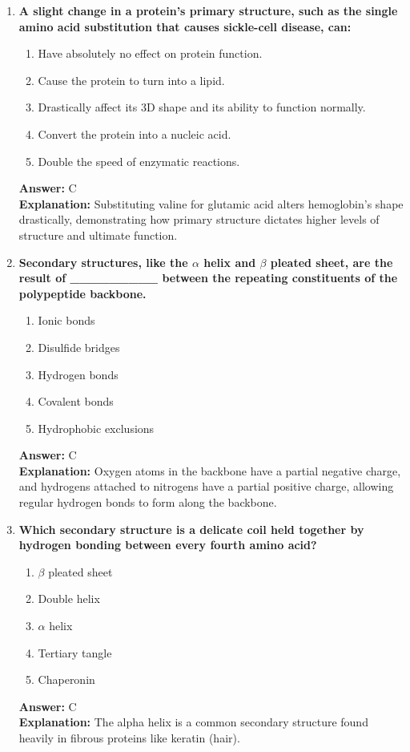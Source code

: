 \documentclass[11pt, a4paper]{article}
\begin{document}
\begin{enumerate}
\item \textbf{A slight change in a protein's primary structure, such as the single amino acid substitution that causes sickle-cell disease, can:}
\begin{enumerate}[label=\Alph*.]
    \item Have absolutely no effect on protein function.
    \item Cause the protein to turn into a lipid.
    \item Drastically affect its 3D shape and its ability to function normally.
    \item Convert the protein into a nucleic acid.
    \item Double the speed of enzymatic reactions.
\end{enumerate}
\textbf{Answer:} C \\
\textbf{Explanation:} Substituting valine for glutamic acid alters hemoglobin's shape drastically, demonstrating how primary structure dictates higher levels of structure and ultimate function.

\item \textbf{Secondary structures, like the $\alpha$ helix and $\beta$ pleated sheet, are the result of \_\_\_\_\_\_\_\_\_ between the repeating constituents of the polypeptide backbone.}
\begin{enumerate}[label=\Alph*.]
    \item Ionic bonds
    \item Disulfide bridges
    \item Hydrogen bonds
    \item Covalent bonds
    \item Hydrophobic exclusions
\end{enumerate}
\textbf{Answer:} C \\
\textbf{Explanation:} Oxygen atoms in the backbone have a partial negative charge, and hydrogens attached to nitrogens have a partial positive charge, allowing regular hydrogen bonds to form along the backbone.

\item \textbf{Which secondary structure is a delicate coil held together by hydrogen bonding between every fourth amino acid?}
\begin{enumerate}[label=\Alph*.]
    \item $\beta$ pleated sheet
    \item Double helix
    \item $\alpha$ helix
    \item Tertiary tangle
    \item Chaperonin
\end{enumerate}
\textbf{Answer:} C \\
\textbf{Explanation:} The alpha helix is a common secondary structure found heavily in fibrous proteins like keratin (hair).


\end{enumerate}
\end{document}
